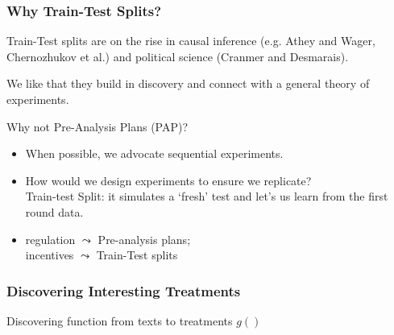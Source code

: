 \documentclass[xcolor=dvipsnames]{beamer}
\begin{document}
\begin{frame}
\frametitle{Why Train-Test Splits?}
\pause
Train-Test splits are on the rise in causal inference (e.g. Athey and Wager, Chernozhukov et al.) and political science (Cranmer and Desmarais). \\ \pause

\medskip

We like that they build in \alert{discovery} and connect with a \alert{general theory of experiments}. \pause

\medskip

Why not Pre-Analysis Plans (PAP)? \pause
\begin{itemize}
\item When possible, we advocate \alert{sequential experiments}. \pause
\item How would we design experiments to \alert{ensure we replicate}? \\ \pause
\alert{Train-test Split}: it simulates a `fresh' test and let's us learn from the first round data. \pause
\item \alert{regulation} $\leadsto$ Pre-analysis plans; \\ \pause
\alert{incentives} $\leadsto$ Train-Test splits
\end{itemize}


\end{frame}


\begin{frame}
  \frametitle{Discovering Interesting Treatments}

\Large
  Discovering function from texts to treatments $g()$ \pause
  \begin{itemize}
     \pause
  \end{itemize}



\end{frame}


\end{document}
